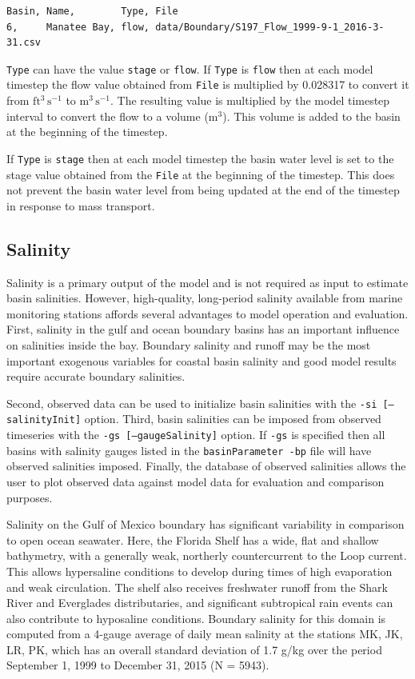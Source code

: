 \begin{verbatim}
Basin, Name,        Type, File
6,     Manatee Bay, flow, data/Boundary/S197_Flow_1999-9-1_2016-3-31.csv
\end{verbatim}

\texttt{Type} can have the value \texttt{stage} or \texttt{flow}. If \texttt{Type} is \texttt{flow} then at each model timestep the flow value obtained from \texttt{File} is multiplied by 0.028317 to convert it from $\mathrm{ft^3\,s^{-1}}$ to $\mathrm{m^3\,s^{-1}}$.  The resulting value is multiplied by the model timestep interval to convert the flow to a volume ($\mathrm{m^3}$).  This volume is added to the basin at the beginning of the timestep. 

If \texttt{Type} is \texttt{stage} then at each model timestep the basin water level is set to the stage value obtained from the \texttt{File} at the beginning of the timestep.  This does not prevent the basin water level from being updated at the end of the timestep in response to mass transport. 

\subsection{Salinity}
\label{sec:Salinity}
Salinity is a primary output of the model and is not required as input to estimate basin salinities.  However, high-quality, long-period salinity available from marine monitoring stations affords several advantages to model operation and evaluation.  First, salinity in the gulf and ocean boundary basins has an important influence on salinities inside the bay.  Boundary salinity and runoff may be the most important exogenous variables for coastal basin salinity and good model results require accurate boundary salinities. 

Second, observed data can be used to initialize basin salinities with the \texttt{-si [--salinityInit]} option.  Third, basin salinities can be imposed from observed timeseries with the \texttt{-gs [--gaugeSalinity]} option.  If \texttt{-gs} is specified then all basins with salinity gauges listed in the \texttt{basinParameter -bp} file will have observed salinities imposed. Finally, the database of observed salinities allows the user to plot observed data against model data for evaluation and comparison purposes.

Salinity on the Gulf of Mexico boundary has significant variability in comparison to open ocean seawater.  Here, the Florida Shelf has a wide, flat and shallow bathymetry, with a generally weak, northerly countercurrent to the Loop current. This allows hypersaline conditions to develop during times of high evaporation and weak circulation.  The shelf also receives freshwater runoff from the Shark River and Everglades distributaries, and significant subtropical rain events can also contribute to hyposaline conditions.  Boundary salinity for this domain is computed from a 4-gauge average of daily mean salinity at the stations MK, JK, LR, PK, which has an overall standard deviation of 1.7 g/kg over the period September 1, 1999 to December 31, 2015 (N = 5943).

